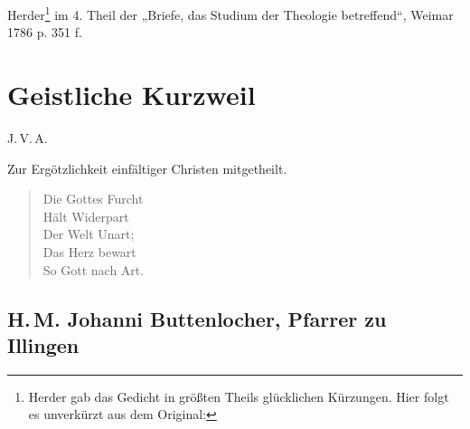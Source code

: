 Herder\footnote{Herder gab das Gedicht in größten Theils glücklichen Kürzungen. Hier folgt es unverkürzt aus dem Original:} im 4. Theil der „Briefe, das Studium der Theologie betreffend“, Weimar 1786 p. 351 f.

\section{Geistliche Kurzweil}

\begin{center}
J.\,V.\,A.
\end{center}

\begin{center}
Zur Ergötzlichkeit einfältiger Christen mitgetheilt.
\end{center}

\begin{verse}
Die Gottes Furcht\\
Hält Widerpart\\
Der Welt Unart;\\
Das Herz bewart\\
So Gott nach Art.
\end{verse}


\subsection[H.\,M. Johanni Buttenlocher]{H.\,M. Johanni Buttenlocher, Pfarrer zu Illingen}

